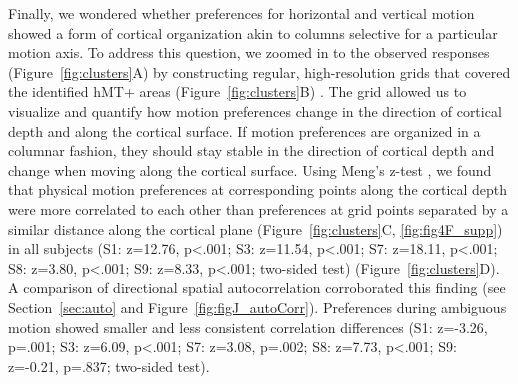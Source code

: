 Finally, we wondered whether preferences for horizontal and vertical motion showed a form of cortical organization akin to columns selective for a particular motion axis. To address this question, we zoomed in to the observed responses (Figure~\ref{fig:clusters}A) by constructing regular, high-resolution grids that covered the identified hMT+ areas (Figure~\ref{fig:clusters}B) \parencite{Zimmermann2011,Kemper2017}. The grid allowed us to visualize and quantify how motion preferences change in the direction of cortical depth and along the cortical surface. If motion preferences are organized in a columnar fashion, they should stay stable in the direction of cortical depth and change when moving along the cortical surface. Using Meng's z-test \parencite{Meng1992}, we found that physical motion preferences at corresponding points along the cortical depth were more correlated to each other than preferences at grid points separated by a similar distance along the cortical plane (Figure~\ref{fig:clusters}C, \ref{fig:fig4F_supp}) \parencite{Nasr2016} in all subjects (S1: z=12.76, p\textless.001; S3: z=11.54, p\textless.001; S7: z=18.11, p\textless.001; S8: z=3.80, p\textless.001; S9: z=8.33, p\textless.001; two-sided test) (Figure~\ref{fig:clusters}D). A comparison of directional spatial autocorrelation corroborated this finding (see Section~\ref{sec:auto} and Figure~\ref{fig:figJ_autoCorr}). Preferences during ambiguous motion showed smaller and less consistent correlation differences (S1: z=-3.26, p=.001; S3: z=6.09, p\textless.001; S7: z=3.08, p=.002; S8: z=7.73, p\textless.001; S9: z=-0.21, p=.837; two-sided test).

